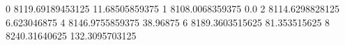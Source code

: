 0 8119.69189453125 11.68505859375
1 8108.0068359375 0.0
2 8114.6298828125 6.623046875
4 8146.9755859375 38.96875
6 8189.3603515625 81.353515625
8 8240.31640625 132.3095703125

